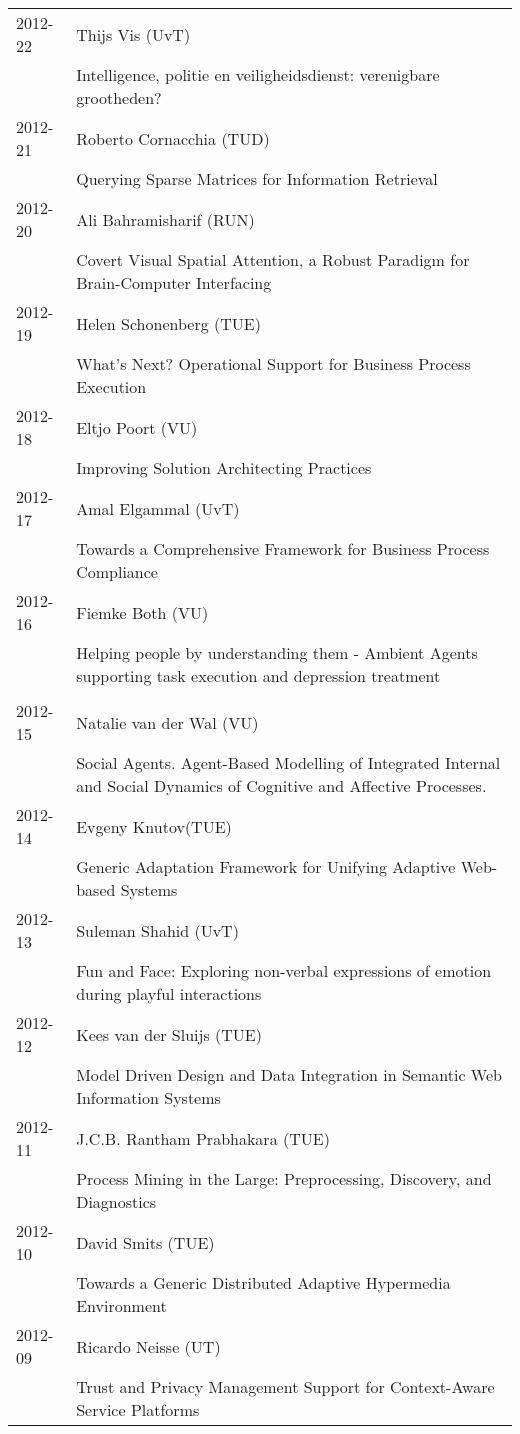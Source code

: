 \begin{longtable}{p{1.25cm}p{10.75cm}}
2012-22 & Thijs Vis (UvT) \\& Intelligence, politie en veiligheidsdienst: verenigbare grootheden? \\
2012-21 & Roberto Cornacchia (TUD) \\& Querying Sparse Matrices for Information Retrieval \\
2012-20 & Ali Bahramisharif (RUN) \\& Covert Visual Spatial Attention, a Robust Paradigm for Brain-Computer \newline Interfacing \\
2012-19 & Helen Schonenberg (TUE) \\& What's Next? Operational Support for Business Process Execution \\
2012-18 & Eltjo Poort (VU) \\& Improving Solution Architecting Practices \\
2012-17 & Amal Elgammal (UvT) \\& Towards a Comprehensive Framework for Business Process Compliance \\
2012-16 & Fiemke Both (VU) \\& Helping people by understanding them - Ambient Agents supporting task execution and depression treatment \\
\\
2012-15 & Natalie van der Wal (VU) \\& Social Agents. Agent-Based Modelling of Integrated Internal and Social Dynamics of Cognitive and Affective Processes. \\
2012-14 & Evgeny Knutov(TUE) \\& Generic Adaptation Framework for Unifying Adaptive Web-based Systems \\
2012-13 & Suleman Shahid (UvT) \\& Fun and Face: Exploring non-verbal expressions of emotion during playful interactions \\
2012-12 & Kees van der Sluijs (TUE) \\& Model Driven Design and Data Integration in Semantic Web Information Systems \\
2012-11 & J.C.B. Rantham Prabhakara (TUE) \\& Process Mining in the Large: Preprocessing, Discovery, and Diagnostics \\
2012-10 & David Smits (TUE) \\& Towards a Generic Distributed Adaptive Hypermedia Environment \\
2012-09 & Ricardo Neisse (UT) \\& Trust and Privacy Management Support for Context-Aware Service Platforms \\

\end{longtable}
